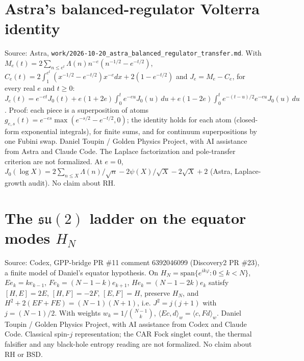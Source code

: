 \documentclass{report}
\theoremstyle{definition}
\begin{document}
\begin{itemize}
\begin{itemize}
\section{Astra's balanced-regulator Volterra identity}
Source: Astra, \texttt{work/2026-10-20\_astra\_balanced\_regulator\_transfer.md}. With $M_e(t)=2\sum_{n\le e^t}\Lambda(n)n^{-e}(n^{-1/2}-e^{-t/2})$,
$C_e(t)=2\int_1^{e^t}(x^{-1/2}-e^{-t/2})x^{-e}dx+2(1-e^{-t/2})$ and $J_e=M_e-C_e$, for every real $e$ and $t\ge0$:
$J_e(t)=e^{-et}J_0(t)+e(1+2e)\int_0^te^{-eu}J_0(u)\,du+e(1-2e)\int_0^te^{-(t-u)/2}e^{-eu}J_0(u)\,du$. Proof: each piece is a superposition of atoms
$g_{e,s}(t)=e^{-es}\max(e^{-s/2}-e^{-t/2},0)$; the identity holds for each atom (closed-form exponential integrals), for finite sums, and for continuum
superpositions by one Fubini swap. Daniel Toupin / Golden Physics Project, with AI assistance from Astra and Claude Code. The Laplace factorization and pole-transfer
criterion are not formalized. At $e=0$, $J_0(\log X)=2\sum_{n\le X}\Lambda(n)/\sqrt n-2\psi(X)/\sqrt X-2\sqrt X+2$ (Astra, Laplace-growth audit). No claim about RH.

\section{The \texorpdfstring{$\mathfrak{su}(2)$}{su(2)} ladder on the equator modes \texorpdfstring{$H_N$}{H\_N}}
Source: Codex, GPP-bridge PR \#11 comment 6392046099 (Discovery2 PR \#23), a finite model of Daniel's equator hypothesis. On $H_N=\mathrm{span}\{e^{ik\varphi}:0\le k<N\}$,
$Ee_k=ke_{k-1}$, $Fe_k=(N-1-k)e_{k+1}$, $He_k=(N-1-2k)e_k$ satisfy $[H,E]=2E$, $[H,F]=-2F$, $[E,F]=H$, preserve $H_N$, and $H^2+2(EF+FE)=(N-1)(N+1)$, i.e. $J^2=j(j+1)$ with
$j=(N-1)/2$. With weights $w_k=1/\binom{N-1}{k}$, $\langle Ec,d\rangle_w=\langle c,Fd\rangle_w$. Daniel Toupin / Golden Physics Project, with AI assistance from Codex and Claude Code.
Classical spin-$j$ representation; the CAR Fock singlet count, the thermal falsifier and any black-hole entropy reading are not formalized. No claim about RH or BSD.


\end{itemize}
\end{itemize}
\end{document}

